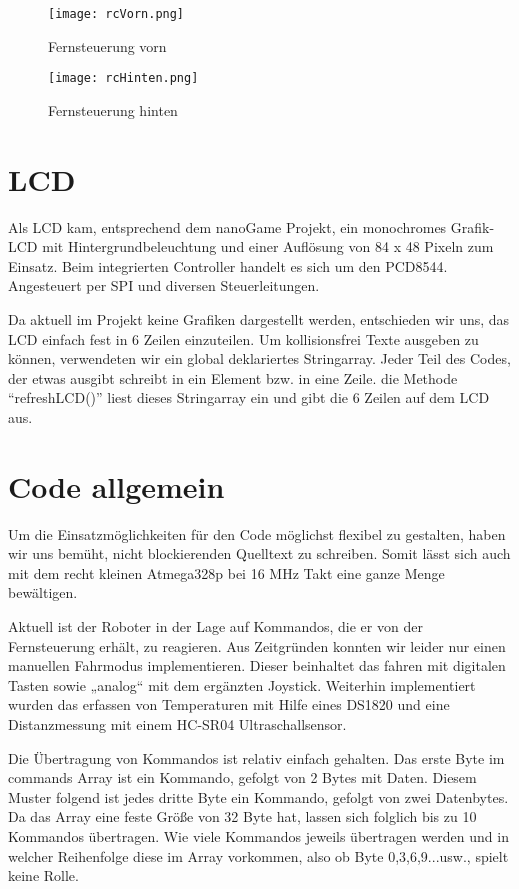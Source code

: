 \documentclass{article}
\begin{document}
\begin{figure}[h]
	\texttt{[image: rcVorn.png]}
	\centering
	\caption{Fernsteuerung vorn}
\end{figure}

\begin{figure}[h]
	\texttt{[image: rcHinten.png]}
	\centering
	\caption{Fernsteuerung hinten}
\end{figure}

\newpage
\section{LCD}

Als LCD kam, entsprechend dem nanoGame \cite{nanoGame} Projekt, ein monochromes Grafik-LCD mit Hintergrundbeleuchtung und einer Auflösung von 84 x 48 Pixeln zum Einsatz. Beim integrierten Controller handelt es sich um den PCD8544. Angesteuert per SPI und diversen Steuerleitungen.

Da aktuell im Projekt keine Grafiken dargestellt werden, entschieden wir uns, das LCD einfach fest in 6 Zeilen einzuteilen. Um kollisionsfrei Texte ausgeben zu können, verwendeten wir ein global deklariertes Stringarray. Jeder Teil des Codes, der etwas ausgibt schreibt in ein Element bzw. in eine Zeile. die Methode "`refreshLCD()"' liest dieses Stringarray ein und gibt die 6 Zeilen auf dem LCD aus.

\section{Code allgemein}%

Um die Einsatzmöglichkeiten für den Code möglichst flexibel zu gestalten, haben wir uns bemüht, nicht blockierenden Quelltext zu schreiben.
Somit lässt sich auch mit dem recht kleinen Atmega328p bei 16 MHz Takt eine ganze Menge bewältigen.

Aktuell ist der Roboter in der Lage auf Kommandos, die er von der Fernsteuerung erhält, zu reagieren. Aus Zeitgründen konnten wir leider nur einen manuellen Fahrmodus implementieren. Dieser beinhaltet das fahren mit digitalen Tasten sowie „analog“ mit dem ergänzten Joystick.
Weiterhin implementiert wurden das erfassen von Temperaturen mit Hilfe eines DS1820 und eine Distanzmessung mit einem HC-SR04 Ultraschallsensor.

Die Übertragung von Kommandos ist relativ einfach gehalten. Das erste Byte im commands Array ist ein Kommando, gefolgt von 2 Bytes mit Daten. Diesem Muster folgend ist jedes dritte Byte ein Kommando, gefolgt von zwei Datenbytes.
Da das Array eine feste Größe von 32 Byte hat, lassen sich folglich bis zu 10 Kommandos übertragen. Wie viele Kommandos jeweils übertragen werden und in welcher Reihenfolge diese im Array vorkommen, also ob Byte 0,3,6,9...usw., spielt keine Rolle.
\end{document}

